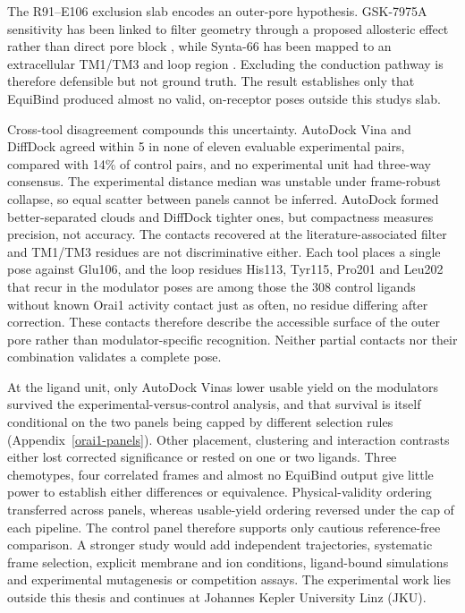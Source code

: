 The R91--E106 exclusion slab encodes an outer-pore hypothesis. GSK-7975A sensitivity has been linked to filter geometry through a proposed allosteric effect rather than direct pore block \cite{ref070}, while Synta-66 has been mapped to an extracellular TM1/TM3 and loop region \cite{ref071}. Excluding the conduction pathway is therefore defensible but not ground truth. The result establishes only that EquiBind produced almost no valid, on-receptor poses outside this study\textquotesingle s slab.

Cross-tool disagreement compounds this uncertainty. AutoDock Vina and DiffDock agreed within 5\angstrom{} in none of eleven evaluable experimental pairs, compared with 14\% of control pairs, and no experimental unit had three-way consensus. The experimental distance median was unstable under frame-robust collapse, so equal scatter between panels cannot be inferred. AutoDock formed better-separated clouds and DiffDock tighter ones, but compactness measures precision, not accuracy. The contacts recovered at the literature-associated filter and TM1/TM3 residues are not discriminative either. Each tool places a single pose against Glu106, and the loop residues His113, Tyr115, Pro201 and Leu202 that recur in the modulator poses are among those the 308 control ligands without known Orai1 activity contact just as often, no residue differing after correction. These contacts therefore describe the accessible surface of the outer pore rather than modulator-specific recognition. Neither partial contacts nor their combination validates a complete pose.

At the ligand unit, only AutoDock Vina\textquotesingle s lower usable yield on the modulators survived the experimental-versus-control analysis, and that survival is itself conditional on the two panels being capped by different selection rules (Appendix~\ref{orai1-panels}). Other placement, clustering and interaction contrasts either lost corrected significance or rested on one or two ligands. Three chemotypes, four correlated frames and almost no EquiBind output give little power to establish either differences or equivalence. Physical-validity ordering transferred across panels, whereas usable-yield ordering reversed under the cap of each pipeline. The control panel therefore supports only cautious reference-free comparison. A stronger study would add independent trajectories, systematic frame selection, explicit membrane and ion conditions, ligand-bound simulations and experimental mutagenesis or competition assays. The experimental work lies outside this thesis and continues at Johannes Kepler University Linz (JKU).

